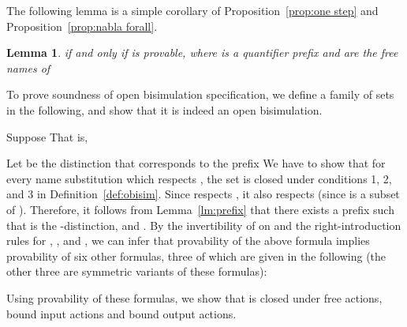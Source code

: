 \documentclass{acmtrans2m}
\newtheorem{lemma}[theorem]{Lemma}
\begin{document}
The following lemma is a simple corollary of Proposition~\ref{prop:one step}
and Proposition~\ref{prop:nabla forall}.
\begin{lemma}
\label{lm:mixed prefix one step}
 if and only if 
is provable, where  is a quantifier prefix and  are the free names of 
\end{lemma}

To prove soundness of open bisimulation specification, we define 
a family of sets  in the following, and show that it is indeed an open
bisimulation.

Suppose  That is, 

Let  be the distinction that corresponds to the prefix 
We have to show that for every name substitution  which respects ,
the set  is closed under conditions 1, 2, and 3 in Definition~\ref{def:obisim}.
Since  respects , it also respects  (since  is a subset of ).
Therefore, it follows from Lemma~\ref{lm:prefix} that there exists a prefix 
such that  is the -distinction, and 
.
By the invertibility of  on  and the right-introduction rules 
for , ,  and , we can infer that provability of the
above formula implies provability of six other formulas, three of which
are given in the following (the other three are symmetric variants of these formulas):

Using provability of these formulas, we show that  is closed under
free actions, bound input actions and bound output actions.
\end{document}
